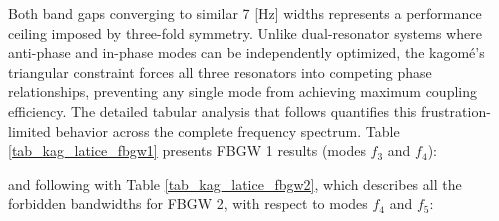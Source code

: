 \documentclass[review,numbers,sort&compress]{elsarticle}
\begin{document}
Both band gaps converging to similar 7 [Hz] widths represents a performance ceiling imposed by three-fold symmetry. Unlike dual-resonator systems where anti-phase and in-phase modes can be independently optimized, the kagomé's triangular constraint forces all three resonators into competing phase relationships, preventing any single mode from achieving maximum coupling efficiency. The detailed tabular analysis that follows quantifies this frustration-limited behavior across the complete frequency spectrum. Table \ref{tab_kag_latice_fbgw1} presents FBGW 1 results (modes \( f_3 \) and \( f_4 \)):

\begin{table}[htb]
    \centering
    \caption{The lower $f_3$ and upper $f_4$ edge frequencies in modes 3 and 4, along with FBGW 1 in a kagomé lattice.}
    \label{tab_kag_latice_fbgw1}
\end{table}

and following with Table \ref{tab_kag_latice_fbgw2}, which describes all the forbidden bandwidths for FBGW 2, with respect to modes $f_4$ and $f_5$:
\end{document}
